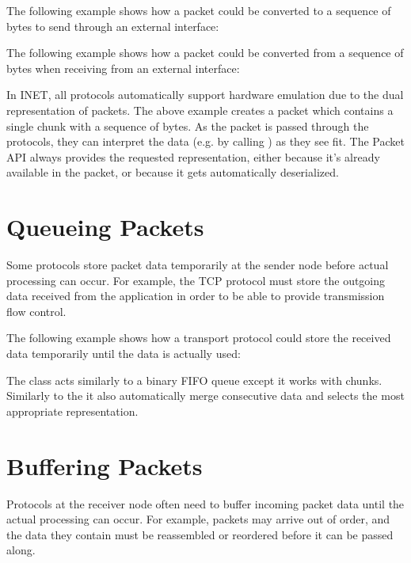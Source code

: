 The following example shows how a packet could be converted to a sequence of
bytes to send through an external interface:


The following example shows how a packet could be converted from a sequence of
bytes when receiving from an external interface:


In INET, all protocols automatically support hardware emulation due to the dual
representation of packets. The above example creates a packet which contains a
single chunk with a sequence of bytes. As the packet is passed through the
protocols, they can interpret the data (e.g. by calling ) as
they see fit. The Packet API always provides the requested representation,
either because it's already available in the packet, or because it gets
automatically deserialized.

\section{Queueing Packets}
\label{sec:packets:queueing-packets}

Some protocols store packet data temporarily at the sender node before actual
processing can occur. For example, the TCP protocol must store the outgoing data
received from the application in order to be able to provide transmission flow
control.

The following example shows how a transport protocol could store the received
data temporarily until the data is actually used:


The  class acts similarly to a binary FIFO queue except it
works with chunks. Similarly to the  it also automatically
merge consecutive data and selects the most appropriate representation.

\section{Buffering Packets}
\label{sec:packets:buffering-packets}

Protocols at the receiver node often need to buffer incoming packet data until
the actual processing can occur. For example, packets may arrive out of order,
and the data they contain must be reassembled or reordered before it can be
passed along.

